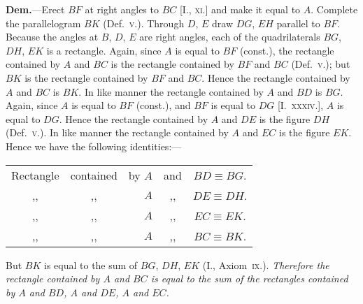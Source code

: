 \documentclass[oneside]{book}
\begin{document}
\textbf{Dem.}---Erect $BF$ at right angles to $BC$ [I., \textsc{xi}.] and
make it equal to $A$. Complete the parallelogram $BK$
(Def.~\textsc{v}.). Through
$D$, $E$ draw $DG$, $EH$
parallel to $BF$. Because
the angles at
$B$, $D$, $E$ are right
angles, each of the
quadrilaterals $BG$,
$DH$, $EK$ is a rectangle.
Again, since $A$ is equal to $BF$ (const.), the
rectangle contained by $A$ and $BC$ is the rectangle contained
by $BF$ and $BC$ (Def.~\textsc{v}.); but $BK$ is the rectangle
contained by $BF$ and $BC$. Hence the rectangle
contained by $A$ and $BC$ is $BK$. In like manner the
rectangle contained by $A$ and $BD$ is $BG$. Again, since
$A$ is equal to $BF$ (const.), and $BF$ is equal to $DG$
[I.~\textsc{xxxiv}.], $A$ is equal to $DG$. Hence the rectangle
contained by $A$ and $DE$ is the figure $DH$ (Def.~\textsc{v}.). In
like manner the rectangle contained by $A$ and $EC$ is
the figure $EK$. Hence we have the following identities:---
\begin{center}
\begin{tabular}{c@{\ }c@{\ }r@{\ }c@{\ }c}
Rectangle & contained & by $A$ & and & $BD \equiv BG$.  \\
    ,,    &     ,,    &    $A$ & ,,  & $DE \equiv DH$.  \\
    ,,    &     ,,    &    $A$ & ,,  & $EC \equiv EK$.  \\
    ,,    &     ,,    &    $A$ & ,,  & $BC \equiv BK$.
\end{tabular}
\end{center}

But $BK$ is equal to the sum of $BG$, $DH$, $EK$
(I., Axiom~\textsc{ix}.). \emph{Therefore the rectangle contained by $A$
and $BC$ is equal to the sum of the rectangles contained by
$A$ and $BD$, $A$ and $DE$, $A$ and $EC$.}\par\medskip
\end{document}
